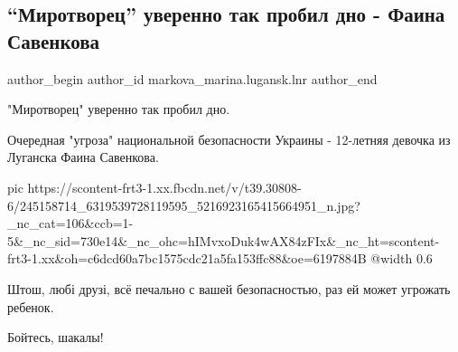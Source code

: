  
 
 
 
 
 
\subsection{\enquote{Миротворец} уверенно так пробил дно - Фаина Савенкова}
\label{sec:12_10_2021.fb.markova_marina.lugansk.lnr.1.savenkova_mirotvorec}
 
\ifcmt
 author_begin
   author_id markova_marina.lugansk.lnr
 author_end
\fi

"Миротворец" уверенно так пробил дно.

Очередная "угроза" национальной безопасности Украины - 12-летняя девочка из
Луганска Фаина Савенкова.

\ifcmt
  pic https://scontent-frt3-1.xx.fbcdn.net/v/t39.30808-6/245158714_6319539728119595_5216923165415664951_n.jpg?_nc_cat=106&ccb=1-5&_nc_sid=730e14&_nc_ohc=hIMvxoDuk4wAX84zFIx&_nc_ht=scontent-frt3-1.xx&oh=c6dcd60a7bc1575cdc21a5fa153ffc88&oe=6197884B
  @width 0.6
\fi

Штош, любі друзі, всё печально с вашей безопасностью, раз ей может угрожать
ребенок.

Бойтесь, шакалы!

